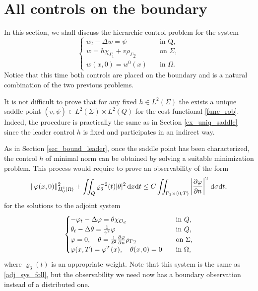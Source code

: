 \documentclass{aims}
\theoremstyle{definition}
\def\cbd{\Gamma}
\def\csbd{\rho_{\Gamma}}
\def\dx{\,\textnormal{d}x}
\def\dt{\textnormal{d}t}
\def\d{\,\textnormal{d}}
\begin{document}
\section{All controls on the boundary}\label{sec_bound}

In this section, we shall discuss the hierarchic control problem for the system
%
\begin{equation}\label{sys_sec3}
\begin{cases}
w_t-\Delta w=\psi & \quad \text{in Q}, \\
w=h\chi_{\cbd_1}+ v{\csbd}_2&\quad \text{on } \Sigma, \\
w(x,0)=w^0(x) &\quad \text{in } \Omega.
\end{cases}
\end{equation}
%
Notice that this time both controls are placed on the boundary and is a natural combination of the two previous problems. %

It is not difficult to prove that for any fixed $h\in L^2(\Sigma)$ the exists a unique saddle point $(\bar v,\bar \psi)\in L^2(\Sigma)\times L^2(Q)$ for the cost functional \eqref{func_rob}. Indeed, the procedure is practically the same as in Section \ref{ex_uniq_saddle} since the leader control $h$ is fixed and participates in an indirect way. 

As in Section \ref{sec_bound_leader}, once the saddle point has been characterized, the control $h$ of minimal norm can be obtained by solving a suitable minimization problem. This process would require to prove an observability of the form
%
\begin{equation}\label{obs_ineq_sec3}
\|\varphi(x,0)\|^2_{H_0^1(\Omega)}+\iint_{Q}\varrho_3^{-2}(t)|\theta|^2\dx\dt\leq C\iint_{ \cbd_1\times(0,T)}\left|\frac{\partial\varphi}{\partial n}\right|^2\d\sigma\dt,
\end{equation}
%
 for the solutions to the adjoint system 
%
\begin{equation}\label{adj_sys_3}
\begin{cases}
-\varphi_t-\Delta \varphi= \theta\chi_{\mathcal O_d} \quad&\textnormal{in }Q, \\
\theta_t-\Delta \theta=\frac{1}{\gamma^2}\varphi \quad& \textnormal{in }Q, \\
\varphi=0, \quad \theta=\frac{1}{\ell^2}\frac{\partial \varphi}{\partial n}{\csbd}_2 \quad &\textnormal{on $\Sigma$,} \\
\varphi(x,T)=\varphi^T(x), \quad \theta(x,0)=0 \quad &\textnormal{in $\Omega$},
\end{cases}
\end{equation}
%
where $\varrho_3(t)$ is an appropriate weight. Note that this system is the same as \eqref{adj_sys_foll}, but the observability we need now has a boundary observation instead of a distributed one. 
\end{document}
